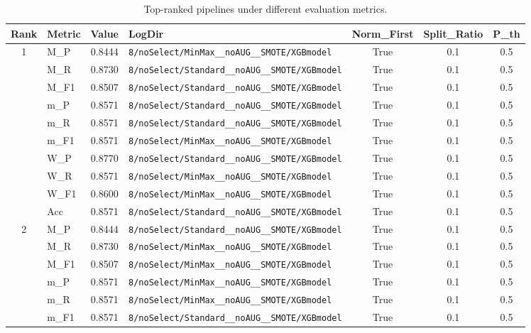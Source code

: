 \begin{table}[htbp]
\caption{Top-ranked pipelines under different evaluation metrics.}
\label{tab:rank_metric_vertical}
\centering
\small
\setlength{\tabcolsep}{4pt}
\begin{tabular}{|c|l|c|>{\ttfamily\footnotesize}p{7.2cm}|c|c|c|}
\hline
Rank & Metric & Value & LogDir & Norm\_First & Split\_Ratio & P\_th \\
\hline
\multirow{10}{*}{1} & M\_P & 0.8444 & \texttt{8/noSelect/MinMax\_\_noAUG\_\_SMOTE/XGBmodel} & True & 0.1 & 0.5 \\
 & M\_R & 0.8730 & \texttt{8/noSelect/Standard\_\_noAUG\_\_SMOTE/XGBmodel} & True & 0.1 & 0.5 \\
 & M\_F1 & 0.8507 & \texttt{8/noSelect/Standard\_\_noAUG\_\_SMOTE/XGBmodel} & True & 0.1 & 0.5 \\
 & m\_P & 0.8571 & \texttt{8/noSelect/Standard\_\_noAUG\_\_SMOTE/XGBmodel} & True & 0.1 & 0.5 \\
 & m\_R & 0.8571 & \texttt{8/noSelect/Standard\_\_noAUG\_\_SMOTE/XGBmodel} & True & 0.1 & 0.5 \\
 & m\_F1 & 0.8571 & \texttt{8/noSelect/MinMax\_\_noAUG\_\_SMOTE/XGBmodel} & True & 0.1 & 0.5 \\
 & W\_P & 0.8770 & \texttt{8/noSelect/Standard\_\_noAUG\_\_SMOTE/XGBmodel} & True & 0.1 & 0.5 \\
 & W\_R & 0.8571 & \texttt{8/noSelect/MinMax\_\_noAUG\_\_SMOTE/XGBmodel} & True & 0.1 & 0.5 \\
 & W\_F1 & 0.8600 & \texttt{8/noSelect/MinMax\_\_noAUG\_\_SMOTE/XGBmodel} & True & 0.1 & 0.5 \\
 & Acc & 0.8571 & \texttt{8/noSelect/Standard\_\_noAUG\_\_SMOTE/XGBmodel} & True & 0.1 & 0.5 \\
\hline
\multirow{10}{*}{2} & M\_P & 0.8444 & \texttt{8/noSelect/Standard\_\_noAUG\_\_SMOTE/XGBmodel} & True & 0.1 & 0.5 \\
 & M\_R & 0.8730 & \texttt{8/noSelect/MinMax\_\_noAUG\_\_SMOTE/XGBmodel} & True & 0.1 & 0.5 \\
 & M\_F1 & 0.8507 & \texttt{8/noSelect/MinMax\_\_noAUG\_\_SMOTE/XGBmodel} & True & 0.1 & 0.5 \\
 & m\_P & 0.8571 & \texttt{8/noSelect/MinMax\_\_noAUG\_\_SMOTE/XGBmodel} & True & 0.1 & 0.5 \\
 & m\_R & 0.8571 & \texttt{8/noSelect/MinMax\_\_noAUG\_\_SMOTE/XGBmodel} & True & 0.1 & 0.5 \\
 & m\_F1 & 0.8571 & \texttt{8/noSelect/Standard\_\_noAUG\_\_SMOTE/XGBmodel} & True & 0.1 & 0.5 \\

\end{tabular}
\end{table}
